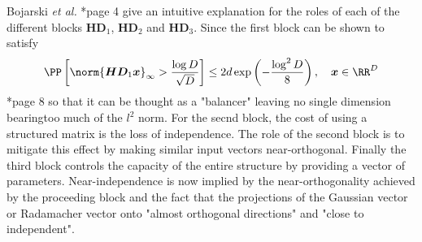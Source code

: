 Bojarski {\it et al.} \cite{BojarskiMariusz2016Saar}*{page 4} give an intuitive explanation for the roles of each of the different blocks $\bm{H} \bm{D}_1$, $\bm{H} \bm{D}_2$ and $\bm{H} \bm{D}_3$. Since the first block can be shown to satisfy
\[
    \PP \left[ \norm{\bm{H}\bm{D}_1 \bm{x}}_{\infty} > \frac{\log D}{\sqrt{D}} \right] \leq 2 d \exp \left( {-\frac{\log^2 D}{8}} \right), \quad \bm{x} \in \RR^D
\]
\cite{LiuFanghui2021RFfK}*{page 8} so that it can be thought as a "balancer" leaving no single dimension bearingtoo much of the $l^2$ norm. For the secnd block, the cost of using a structured matrix is the loss of independence. The role of the second block is to mitigate this effect by making similar input vectors near-orthogonal. Finally the third block controls the capacity of the entire structure by providing a vector of parameters. Near-independence is now implied by the near-orthogonality achieved by the proceeding block and the fact that the projections of the Gaussian vector or Radamacher vector onto "almost orthogonal directions" and "close to independent".